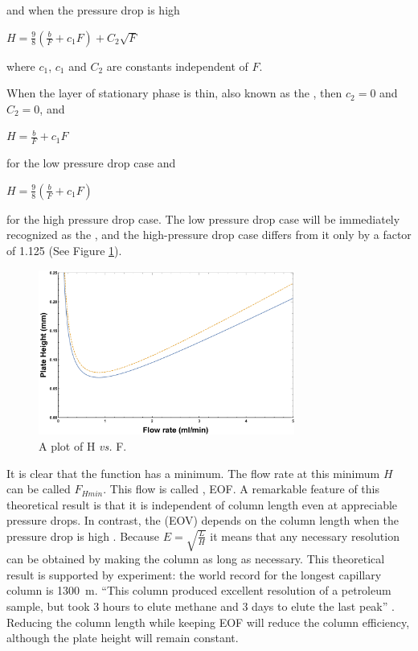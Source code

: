 and when the pressure drop is high

\(H = \frac{\displaystyle 9}{\displaystyle 8} \left(\frac{b}{F}+c_{1}F \right)+C_{2}\sqrt{F}\)

where \(c_1\), \(c_1\) and \(C_2\) are constants independent of \(F\).

When the layer of stationary phase is thin, also known as the , then \(c_2 = 0\) and \(C_2 = 0\), and

\(H = \frac{\displaystyle b}{\displaystyle F} + c_{1} F \) 

for the low pressure drop case and 

\(H = \frac{\displaystyle 9}{\displaystyle 8} \left(\frac{b}{F}+c_{1}F \right)\)

for the high pressure drop case. The low pressure drop case will be immediately
recognized as the , and the high-pressure drop
case differs from it only by a factor of \num{1.125} (See Figure
\ref{fig:VanDeemter}).

\begin{figure}
\centering
\includegraphics[width=0.75\textwidth]{Figures/VanDeemter.pdf}
\decoRule
\caption[A plot of H \textit{vs.} F]{A plot of H \textit{vs.} F.}
\label{fig:VanDeemter}
\end{figure}

It is clear that the function has a minimum. The flow rate at this minimum \(H\)
can be called \(F_{Hmin}\). This flow is called , EOF. A remarkable feature of this theoretical result is that it is
independent of column length \autocite{Blumberg1999} even at appreciable
pressure drops. In contrast, the  (EOV)
depends on the column length when the pressure drop is high
\autocite{Blumberg1997}. Because \(E = \sqrt{\frac{L}{H}} \) it means that any
necessary resolution can be obtained by making the column as long as necessary.
This theoretical result is supported by experiment: the world record for the
longest capillary column is \SI{1300}{\metre}. ``This column produced excellent
resolution of a petroleum sample, but took 3 hours to elute methane and 3 days
to elute the last peak'' \autocite{Ferguson2013}. Reducing the column length
while keeping EOF will reduce the column efficiency, although the plate height
will remain constant.

